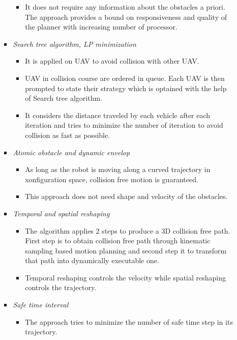 \documentclass[12pt]{article}
\begin{document}
\begin{itemize}
\begin{itemize}
\begin{itemize}
\begin{itemize}
                \item It does not require any information about the obstacles a priori. The approach provides a bound on responsiveness and quality of the planner with increasing number of processor.
            \end{itemize}
            \item \textit{Search tree algorithm, LP minimization}
            \begin{itemize}
                \item It is applied on UAV to avoid collision with other UAV\@. 
                \item UAV in collision course are ordered in queue. Each UAV is then prompted to state their strategy which is optained with the help of Search tree algorithm.
                \item It considers the distance traveled by each vehicle after each iteration and tries to minimize the number of iteration to avoid collision as fast as possible.
            \end{itemize}
            \item \textit{Atomic obstacle and dynamic envelop}
            \begin{itemize}
                \item As long as the robot is moving along a curved trajectory in xonfiguration space, collision free motion is guaranteed.
                \item This approach does not need shape and velocity of the obstacles.
            \end{itemize}
            \item \textit{Temporal and spatial reshaping}
            \begin{itemize}
                \item The algorithm applies 2 steps to produce a 3D collision free path. First step is to obtain collision free path through kinematic sampling based motion planning and second step it to transform that path into dynamically executable one.
                \item Temporal reshaping controls the velocity while spatial reshaping controls the trajectory.
            \end{itemize}
            \item \textit{Safe time interval}
            \begin{itemize}
                \item The approach tries to minimize the number of safe time step in its trajectory.

\end{itemize}
\end{itemize}
\end{itemize}
\end{itemize}
\end{document}
